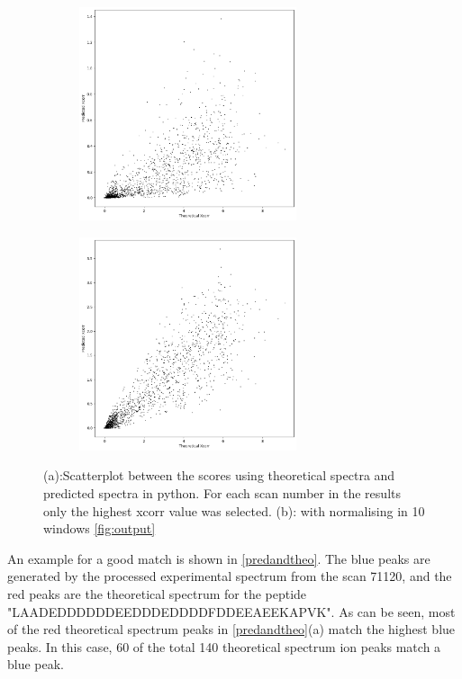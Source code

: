 \documentclass[11pt]{article}
\begin{document}
\begin{figure}
\centering
\begin{subfigure}[b]{1\textwidth}
    \includegraphics[width=0.7\textwidth]{figs/scatterplot_predicted_theoretical.png}
   \caption{}
   \label{fig:scatterplot_predicted_theoretical} 
\end{subfigure}
\begin{subfigure}[b]{1\textwidth}
   \includegraphics[width=0.7\textwidth]{figs/scatterplot_windows.png}
   \caption{}
   \label{fig:scatterplot_windows}
\end{subfigure}
\caption{(a):Scatterplot between the scores using theoretical spectra and predicted spectra in python. For each scan number in the results only the highest xcorr value was selected. (b): with normalising in 10 windows \cref{fig:output}}
\label{scatterplot_python}
\end{figure}
An example for a good match is shown in \cref{predandtheo}. The blue peaks are generated by the processed experimental spectrum from the scan 71120, and the red peaks are the theoretical spectrum for the peptide "LAADEDDDDDDEEDDDEDDDDFDDEEAEEKAPVK". As can be seen, most of the red theoretical spectrum peaks in \cref{predandtheo}(a) match the highest blue peaks. In this case, 60 of the total 140 theoretical spectrum ion peaks match a blue peak. 
\end{document}
